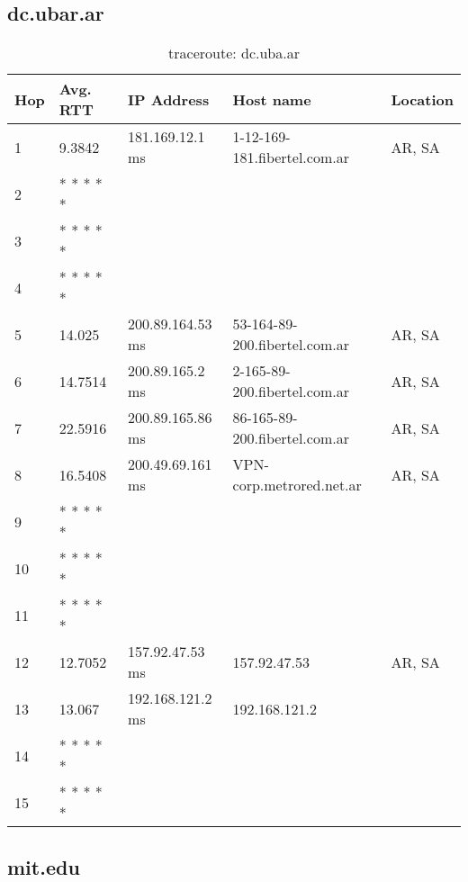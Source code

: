 \subsection{dc.ubar.ar}

\begin{table}[H]
\centering
\begin{tabular}{@{}lllll@{}}
\toprule
Hop & Avg. RTT & IP Address & Host name & Location\\ \midrule
1 & 9.3842 & 181.169.12.1 ms & 1-12-169-181.fibertel.com.ar & AR, SA\\
2 &  * * * * * &  &  &  \\
3 &  * * * * * &  &  &  \\
4 &  * * * * * &  &  &  \\
5 & 14.025 & 200.89.164.53 ms & 53-164-89-200.fibertel.com.ar & AR, SA\\
6 & 14.7514 & 200.89.165.2 ms & 2-165-89-200.fibertel.com.ar & AR, SA\\
7 & 22.5916 & 200.89.165.86 ms & 86-165-89-200.fibertel.com.ar & AR, SA\\
8 & 16.5408 & 200.49.69.161 ms & VPN-corp.metrored.net.ar & AR, SA\\
9 &  * * * * * &  &  &  \\
10 &  * * * * * &  &  &  \\
11 &  * * * * * &  &  &  \\
12 & 12.7052 & 157.92.47.53 ms & 157.92.47.53 & AR, SA\\
13 & 13.067 & 192.168.121.2 ms & 192.168.121.2 &  \\
14 &  * * * * * &  &  &  \\
15 &  * * * * * &  &  &  \\

 \bottomrule
\end{tabular}
\caption{traceroute: dc.uba.ar}
\label{dc}
\end{table}

\subsection{mit.edu}

